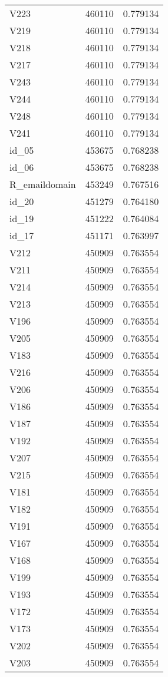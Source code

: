\begin{tabular}{lrr}
V223 & 460110 & 0.779134 \\
V219 & 460110 & 0.779134 \\
V218 & 460110 & 0.779134 \\
V217 & 460110 & 0.779134 \\
V243 & 460110 & 0.779134 \\
V244 & 460110 & 0.779134 \\
V248 & 460110 & 0.779134 \\
V241 & 460110 & 0.779134 \\
id_05 & 453675 & 0.768238 \\
id_06 & 453675 & 0.768238 \\
R_emaildomain & 453249 & 0.767516 \\
id_20 & 451279 & 0.764180 \\
id_19 & 451222 & 0.764084 \\
id_17 & 451171 & 0.763997 \\
V212 & 450909 & 0.763554 \\
V211 & 450909 & 0.763554 \\
V214 & 450909 & 0.763554 \\
V213 & 450909 & 0.763554 \\
V196 & 450909 & 0.763554 \\
V205 & 450909 & 0.763554 \\
V183 & 450909 & 0.763554 \\
V216 & 450909 & 0.763554 \\
V206 & 450909 & 0.763554 \\
V186 & 450909 & 0.763554 \\
V187 & 450909 & 0.763554 \\
V192 & 450909 & 0.763554 \\
V207 & 450909 & 0.763554 \\
V215 & 450909 & 0.763554 \\
V181 & 450909 & 0.763554 \\
V182 & 450909 & 0.763554 \\
V191 & 450909 & 0.763554 \\
V167 & 450909 & 0.763554 \\
V168 & 450909 & 0.763554 \\
V199 & 450909 & 0.763554 \\
V193 & 450909 & 0.763554 \\
V172 & 450909 & 0.763554 \\
V173 & 450909 & 0.763554 \\
V202 & 450909 & 0.763554 \\
V203 & 450909 & 0.763554 \\

\end{tabular}
